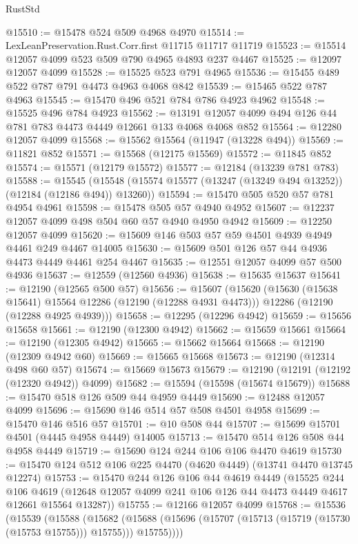 \begin{lexlean}{RustStd}
\begin{coremodule}
@15510 := @15478 @524 @509 @4968 @4970
@15514 := LexLeanPreservation.Rust.Corr.first @11715 @11717 @11719
@15523 := @15514 @12057 @4099 @523 @509 @790 @4965 @4893 @237 @4467
@15525 := @12097 @12057 @4099
@15528 := @15525 @523 @791 @4965
@15536 := @15455 @489 @522 @787 @791 @4473 @4963 @4068 @842
@15539 := @15465 @522 @787 @4963
@15545 := @15470 @496 @521 @784 @786 @4923 @4962
@15548 := @15525 @496 @784 @4923
@15562 := @13191 @12057 @4099 @494 @126 @44 @781 @783 @4473 @4449 @12661 @133 @4068 @4068 @852
@15564 := @12280 @12057 @4099
@15568 := @15562 @15564 (@11947 (@13228 @494))
@15569 := @11821 @852
@15571 := @15568 (@12175 @15569)
@15572 := @11845 @852
@15574 := @15571 (@12179 @15572)
@15577 := @12184 (@13239 @781 @783)
@15588 := @15545
    (@15548 (@15574 @15577 (@13247 (@13249 @494 @13252)) (@12184 (@12186 @494)) @13260))
@15594 := @15470 @505 @520 @57 @781 @4954 @4961
@15598 := @15478 @505 @57 @4940 @4952
@15607 := @12237 @12057 @4099 @498 @504 @60 @57 @4940 @4950 @4942
@15609 := @12250 @12057 @4099
@15620 := @15609 @146 @503 @57 @59 @4501 @4939 @4949 @4461 @249 @4467 @14005
@15630 := @15609 @501 @126 @57 @44 @4936 @4473 @4449 @4461 @254 @4467
@15635 := @12551 @12057 @4099 @57 @500 @4936
@15637 := @12559 (@12560 @4936)
@15638 := @15635 @15637
@15641 := @12190 (@12565 @500 @57)
@15656 := @15607
    (@15620
      (@15630 (@15638 @15641) @15564 @12286 (@12190 (@12288 @4931 @4473)))
      @12286
      (@12190 (@12288 @4925 @4939)))
@15658 := @12295 (@12296 @4942)
@15659 := @15656 @15658
@15661 := @12190 (@12300 @4942)
@15662 := @15659 @15661
@15664 := @12190 (@12305 @4942)
@15665 := @15662 @15664
@15668 := @12190 (@12309 @4942 @60)
@15669 := @15665 @15668
@15673 := @12190 (@12314 @498 @60 @57)
@15674 := @15669 @15673
@15679 := @12190 (@12191 (@12192 (@12320 @4942)) @4099)
@15682 := @15594 (@15598 (@15674 @15679))
@15688 := @15470 @518 @126 @509 @44 @4959 @4449
@15690 := @12488 @12057 @4099
@15696 := @15690 @146 @514 @57 @508 @4501 @4958
@15699 := @15470 @146 @516 @57
@15701 := @10 @508 @44
@15707 := @15699 @15701 @4501 (@4445 @4958 @4449) @14005
@15713 := @15470 @514 @126 @508 @44 @4958 @4449
@15719 := @15690 @124 @244 @106 @106 @4470 @4619
@15730 := @15470 @124 @512 @106 @225 @4470 (@4620 @4449) (@13741 @4470 @13745 @12274)
@15753 := @15470
    @244
    @126
    @106
    @44
    @4619
    @4449
    (@15525
      @244
      @106
      @4619
      (@12648 @12057 @4099 @241 @106 @126 @44 @4473 @4449 @4617 @12661 @15564 @13287))
@15755 := @12166 @12057 @4099
@15768 := @15536
    (@15539
      (@15588
        (@15682
          (@15688 (@15696 (@15707 (@15713 (@15719 (@15730 (@15753 @15755))) @15755))) @15755))))

\end{coremodule}
\end{lexlean}
